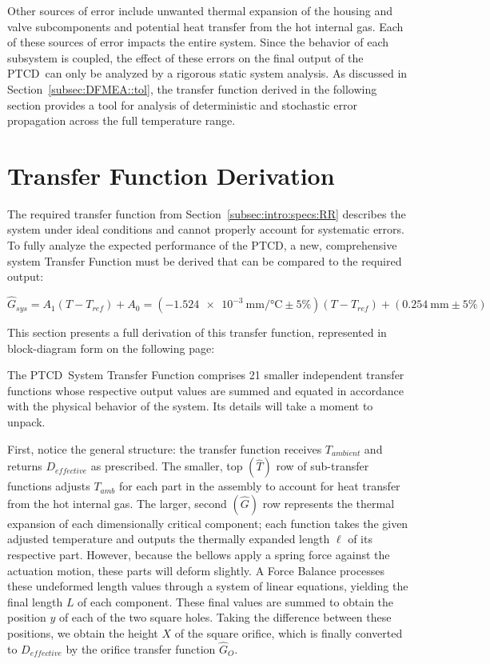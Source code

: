 \documentclass[12pt, letterpaper]{report}%
\newcounter{mycounter}           %
\newcounter{sub}[mycounter]      %
\newcommand{\device}{PTCD}
\newcommand{\AoneExact}{\SI{-1.524e-3}{\milli\meter\per\celsius}}
\newcommand{\Aone}{\AoneExact \pm 5\%}
\newcommand{\AzeroExact}{\SI{0.254}{\milli\meter}}
\newcommand{\Azero}{\AzeroExact \pm 5\%}
\begin{document}
\begin{appendices}
		Other sources of error include unwanted thermal expansion of the housing and valve subcomponents and potential heat transfer from the hot internal gas.
		Each of these sources of error impacts the entire system. Since the behavior of each subsystem is coupled, the effect of these errors on the final output of the \device\ can only be analyzed by a rigorous static system analysis.
		As discussed in Section~\ref{subsec:DFMEA::tol}, the transfer function derived in the following section provides a tool for analysis of deterministic and stochastic error propagation across the full temperature range.

	\section{Transfer Function Derivation}
	\label{app:sat:TF}

		The required transfer function from Section~\ref{subsec:intro:specs:RR} describes the system under ideal conditions and cannot properly account for systematic errors.
		To fully analyze the expected performance of the \device, a new, comprehensive system Transfer Function must be derived that can be compared to the required output: 

		\begin{equation}
			\hat{G}_{sys} = A_1 (T-T_{ref}) + A_0 = (\Aone)(T-T_{ref}) + (\Azero)
			\label{eq:req_TF}
		\end{equation}

		This section presents a full derivation of this transfer function, represented in block-diagram form on the following page:
		

		The \device\ System Transfer Function comprises 21 smaller independent transfer functions whose respective output values are summed and equated in accordance with the physical behavior of the system.
		Its details will take a moment to unpack.

		First, notice the general structure: the transfer function receives $T_{ambient}$ and returns $D_{effective}$ as prescribed.
		The smaller, top $(\hat{T})$ row of sub-transfer functions adjusts $T_{amb}$ for each part in the assembly to account for heat transfer from the hot internal gas.
		The larger, second $(\hat{G})$ row represents the thermal expansion of each dimensionally critical component; each function takes the given adjusted temperature and outputs the thermally expanded length $\ell$ of its respective part.
		However, because the bellows apply a spring force against the actuation motion, these parts will deform slightly. A Force Balance processes these undeformed length values through a system of linear equations, yielding the final length $L$ of each component.
		These final values are summed to obtain the position $y$ of each of the two square holes. Taking the difference between these positions, we obtain the height $X$ of the square orifice, which is finally converted to $D_{effective}$ by the orifice transfer function $\hat{G}_O$.
		

\end{appendices}
\end{document}
